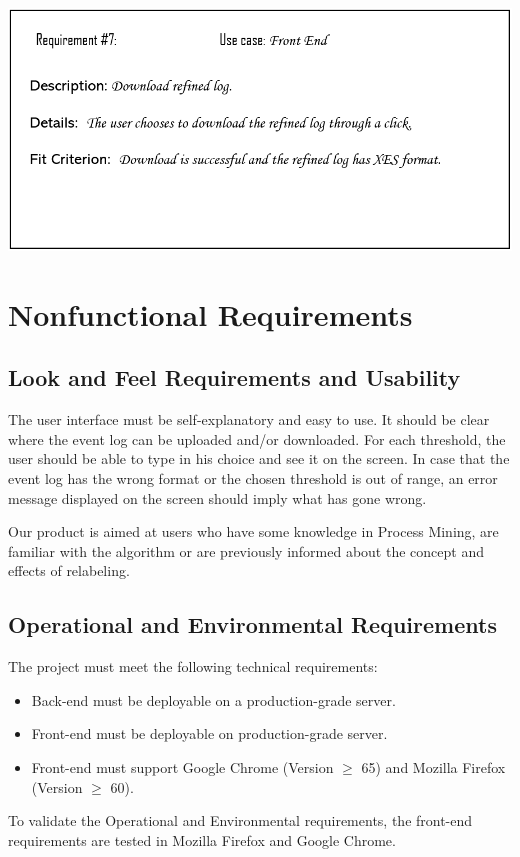 \documentclass[notitlepage]{article}
\begin{document}
\begin{flushleft}
\includegraphics[scale=0.6]{Req7.png}




\section{Nonfunctional Requirements}

\subsection{Look and Feel Requirements and Usability}
The user interface must be self-explanatory and easy to use.
It should be clear where the event log can be uploaded and/or downloaded.
For each threshold, the user should be able to type in his choice and see it on the screen.
In case that the event log has the wrong format or the chosen threshold is out of range, an error message displayed on the screen should imply what has gone wrong.

Our product is aimed at users who have some knowledge in Process Mining, are familiar with the algorithm or are previously informed about the concept and effects of relabeling.





\subsection{Operational and Environmental Requirements}
The project must meet the following technical requirements:
\medskip
\begin{itemize}
	\item Back-end must be deployable on a production-grade server.
	\item Front-end must be deployable on production-grade server.
	\item Front-end must support Google Chrome (Version $\geq$ 65) and Mozilla Firefox (Version $\geq$ 60).
\end{itemize}
\medskip
To validate the Operational and Environmental requirements, the front-end requirements are tested in Mozilla Firefox and Google Chrome. 

\end{flushleft}
\end{document}
